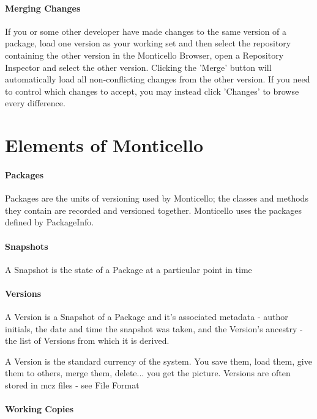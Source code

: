 \documentclass[a4paper,10pt,twoside]{book}
\begin{document}
\paragraph{Merging Changes}

If you or some other developer have made changes to the same version of a package, load one version as your working set and then select the repository containing the other version in the Monticello Browser, open a Repository Inspector and select the other version. Clicking the 'Merge' button will automatically load all non-conflicting changes from the other version. If you need to control which changes to accept, you may instead click 'Changes' to browse every difference.



\section{Elements of Monticello}

\paragraph{Packages}

Packages are the units of versioning used by Monticello; the classes and methods they contain are recorded and versioned together. Monticello uses the packages defined by PackageInfo.

\paragraph{Snapshots}

A Snapshot is the state of a Package at a particular point in time

\paragraph{Versions}

A Version is a Snapshot of a Package and it's associated metadata - author initials, the date and time the snapshot was taken, and the Version's ancestry - the list of Versions from which it is derived.

A Version is the standard currency of the system. You save them, load them, give them to others, merge them, delete... you get the picture. Versions are often stored in mcz files - see File Format

\paragraph{Working Copies}
\end{document}
